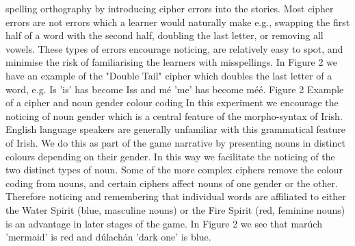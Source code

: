 \documentclass[10pt,twoside,english,a4paper]{article}
\begin{document}
spelling orthography by introducing cipher errors into the stories. Most cipher errors are not errors which a learner would naturally make e.g., swapping the first half of a word with the second half, doubling the last letter, or removing all vowels. These types of errors encourage noticing, are relatively easy to spot, and minimise the risk of familiarising the learners with misspellings. In Figure 2 we have an example of the "Double Tail" cipher which doubles the last letter of a word, e.g. Is 'is' has become Iss and mé 'me' has become méé. Figure 2 Example of a cipher and noun gender colour coding In this experiment we encourage the noticing of noun gender which is a central feature of the morpho-syntax of Irish. English language speakers are generally unfamiliar with this grammatical feature of Irish. We do this as part of the game narrative by presenting nouns in distinct colours depending on their gender. In this way we facilitate the noticing of the two distinct types of noun. Some of the more complex ciphers remove the colour coding from nouns, and certain ciphers affect nouns of one gender or the other. Therefore noticing and remembering that individual words are affiliated to either the Water Spirit (blue, masculine nouns) or the Fire Spirit (red, feminine nouns) is an advantage in later stages of the game. In Figure 2 we see that marúch 'mermaid' is red and dúlachán 'dark one' is blue.
\end{document}
